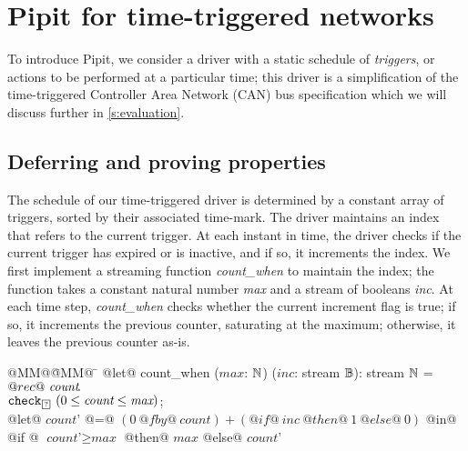 
\section{Pipit for time-triggered networks}
\label{s:motivation}


To introduce Pipit, we consider a driver with a static schedule of \emph{triggers}, or actions to be performed at a particular time; this driver is a simplification of the time-triggered Controller Area Network (CAN) bus specification \cite{fuehrer2001time} which we will discuss further in \autoref{s:evaluation}.

\subsection{Deferring and proving properties}

The schedule of our time-triggered driver is determined by a constant array of triggers, sorted by their associated time-mark.
The driver maintains an index that refers to the current trigger.
At each instant in time, the driver checks if the current trigger has expired or is inactive, and if so, it increments the index.
We first implement a streaming function \emph{count_when} to maintain the index; the function takes a constant natural number \emph{max} and a stream of booleans \emph{inc}.
At each time step, \emph{count_when} checks whether the current increment flag is true; if so, it increments the previous counter, saturating at the maximum; otherwise, it leaves the previous counter as-is.

\begin{tabbing}
  @MM@\= @MM@ \= \kill
  @let@ count_when ($\textit{max}$: $\mathbb{N}$) ($\textit{inc}$: stream $\mathbb{B}$): stream $\mathbb{N}$ = \\
    \> $@rec@~\textit{count}\hspace{-0.1em}.~$ \\
    \> \> $\xcheckP{\PSUnknown}{(0 \le \textit{count} \le \textit{max})}$; \\
    \> \> @let@ $\textit{count'}$ @=@ $(0~@fby@~\textit{count}) + (@if@~\textit{inc}~@then@~1~@else@~0)$ @in@ \\
    \> \> @if @ $\textit{count'} \ge \textit{max}$ @then@ $\textit{max}$  @else@ $\textit{count'}$
\end{tabbing}

